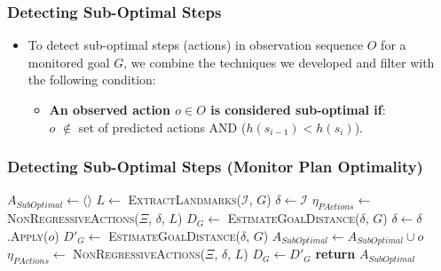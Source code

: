 \documentclass{beamer}
\begin{document}
\begin{frame}[c]\frametitle{Detecting Sub-Optimal Steps}

	\begin{itemize}
		\item To detect sub-optimal steps (actions) in observation sequence $O$ for a monitored goal $G$, we combine the techniques we developed and filter with the following condition:
			\begin{itemize}
            	\item \textbf{An observed action $o \in O$ is considered sub-optimal if}: \\ $o$ $\notin$ set of predicted actions AND ($h(s_{i-1}) < h(s_i)$).
			\end{itemize}  
	\end{itemize}
\end{frame}


\begin{frame}[c]\frametitle{Detecting Sub-Optimal Steps (Monitor Plan Optimality)}
    \begin{algorithmic}[1]
        		\State $A_{SubOptimal} \gets \langle\rangle$ 
        		\State $L \gets $ \textsc{ExtractLandmarks($\mathcal{I}$, $G$)}
			\State $\delta \gets \mathcal{I}$ 
			\State $\eta_{PActions} \gets $ \textsc{NonRegressiveActions}($\Xi$, $\delta$, $L$)
			\State $D_{G} \gets$ \textsc{EstimateGoalDistance}($\delta$, $G$)  
        			\State $\delta \gets \delta$.\textsc{Apply}($o$)
        			\State $D'_{G} \gets$ \textsc{EstimateGoalDistance}($\delta$, $G$)
        			\label{alg:monitor:estimatesuboptimalstep}
              		\State $A_{SubOptimal} \gets A_{SubOptimal} \cup o$
            		\EndIf
				\State $\eta_{PActions} \gets$ {\textsc{NonRegressiveActions}($\Xi$, $\delta$, $L$)}
        			\State $D_{G} \gets D'_{G}$
        		\EndFor
        		\State \textbf{return} $A_{SubOptimal}$
        \EndFunction
    \end{algorithmic}
\end{frame}
\end{document}
